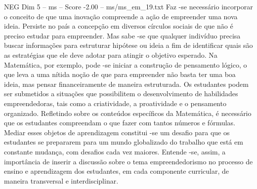 \begin{textsample}{NEG Dim 5 – ms – Score -2.00 – ms/ms\_em\_19.txt}
Faz -se necessário incorporar o conceito de que uma inovação compreende a ação de empreender uma nova ideia.
Persiste no país a concepção em diversos círculos sociais de que não é preciso estudar para empreender.
Mas sabe -se que qualquer indivíduo precisa buscar informações para estruturar hipótese ou ideia a fim de identificar quais são as estratégias que ele deve adotar para atingir o objetivo esperado.
Na Matemática, por exemplo, pode -se iniciar a construção de pensamento lógico, o que leva a uma nítida noção de que para empreender não basta ter uma boa ideia, mas pensar financeiramente de maneira estruturada.
Os estudantes podem ser submetidos a situações que possibilitem o desenvolvimento de habilidades empreendedoras, tais como a criatividade, a proatividade e o pensamento organizado.
Refletindo sobre os conteúdos específicos da Matemática, é necessário que os estudantes compreendam o que fazer com tantos números e fórmulas.
Mediar esses objetos de aprendizagem constitui -se um desafio para que os estudantes se prepararem para um mundo globalizado do trabalho que está em constante mudança, com desafios cada vez maiores.
Entende -se, assim, a importância de inserir a discussão sobre o tema empreendedorismo no processo de ensino e aprendizagem dos estudantes, em cada componente curricular, de maneira transversal e interdisciplinar.

\end{textsample}
